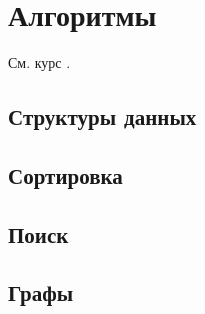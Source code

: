 \chapter{Алгоритмы}

См. курс \cite{coursera:algorithm-design-analysis}.
\section{Структуры данных}
\section{Сортировка}
\section{Поиск}
\section{Графы}
